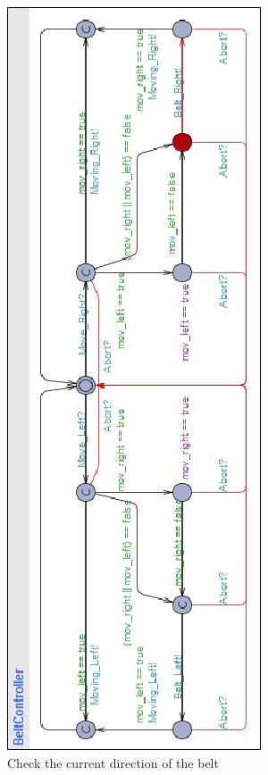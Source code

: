 \documentclass[a4paper,oneside,11pt]{report}
\begin{document}
\begin{figure}
\centering
\includegraphics[height=0.75\textheight]{images/BCTR2.jpg}
\caption{Check the current direction of the belt}
\label{fig:bctr2}
\end{figure}
\end{document}
